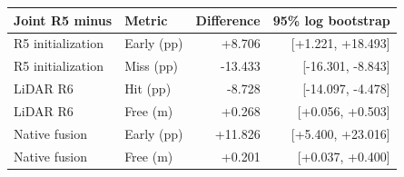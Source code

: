 \begin{tabular}{llrr}
\toprule
Joint R5 minus & Metric & Difference & 95\% log bootstrap \\
\midrule
R5 initialization & Early (pp) & +8.706 & [+1.221, +18.493] \\
R5 initialization & Miss (pp) & -13.433 & [-16.301, -8.843] \\
LiDAR R6 & Hit (pp) & -8.728 & [-14.097, -4.478] \\
LiDAR R6 & Free (m) & +0.268 & [+0.056, +0.503] \\
Native fusion & Early (pp) & +11.826 & [+5.400, +23.016] \\
Native fusion & Free (m) & +0.201 & [+0.037, +0.400] \\
\bottomrule
\end{tabular}
